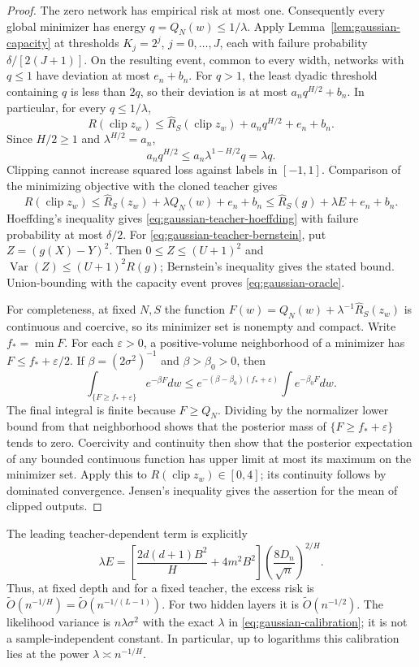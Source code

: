 \begin{proof}
The zero network has empirical risk at most one.  Consequently every
global minimizer has energy $q=Q_N(w)\leq1/\lambda$.
Apply Lemma~\ref{lem:gaussian-capacity} at thresholds
$K_j=2^j$, $j=0,\ldots,J$, each with failure probability
$\delta/[2(J+1)]$.  On the resulting event, common to every width,
networks with $q\leq1$ have deviation at most $e_n+b_n$.  For $q>1$,
the least dyadic threshold containing $q$ is less than $2q$, so their
deviation is at most $a_n q^{H/2}+b_n$.  In particular, for every
$q\leq1/\lambda$,
\[
 R(\operatorname{clip}z_w)
 \leq\widehat R_S(\operatorname{clip}z_w)
       +a_nq^{H/2}+e_n+b_n.
\]
Since $H/2\geq1$ and $\lambda^{H/2}=a_n$,
\[
 a_nq^{H/2}\leq a_n\lambda^{1-H/2}q=\lambda q.
\]
Clipping cannot increase squared loss against labels in $[-1,1]$.
Comparison of the minimizing objective with the cloned teacher gives
\[
 R(\operatorname{clip}z_w)
 \leq\widehat R_S(z_w)+\lambda Q_N(w)+e_n+b_n
 \leq\widehat R_S(g)+\lambda E+e_n+b_n.
\]
Hoeffding's inequality gives
\eqref{eq:gaussian-teacher-hoeffding} with failure probability at most
$\delta/2$.  For \eqref{eq:gaussian-teacher-bernstein}, put
$Z=(g(X)-Y)^2$.  Then $0\leq Z\leq(U+1)^2$ and
$\operatorname{Var}(Z)\leq(U+1)^2R(g)$; Bernstein's inequality gives
the stated bound.  Union-bounding with the capacity event proves
\eqref{eq:gaussian-oracle}.

For completeness, at fixed $N,S$ the function
$F(w)=Q_N(w)+\lambda^{-1}\widehat R_S(z_w)$ is continuous and coercive,
so its minimizer set is nonempty and compact.  Write $f_* =\min F$.
For each $\varepsilon>0$, a positive-volume neighborhood of a minimizer
has $F\leq f_*+\varepsilon/2$.  If $\beta=(2\sigma^2)^{-1}$ and
$\beta>\beta_0>0$, then
\[
 \int_{\{F\geq f_*+\varepsilon\}}e^{-\beta F}dw
 \leq e^{-(\beta-\beta_0)(f_*+\varepsilon)}
       \int e^{-\beta_0F}dw.
\]
The final integral is finite because $F\geq Q_N$.  Dividing by the
normalizer lower bound from that neighborhood shows that the posterior
mass of $\{F\geq f_*+\varepsilon\}$ tends to zero.  Coercivity and
continuity then show that the posterior expectation of any bounded
continuous function has upper limit at most its maximum on the
minimizer set.  Apply this to $R(\operatorname{clip}z_w)\in[0,4]$;
its continuity follows by dominated convergence.  Jensen's inequality
gives the assertion for the mean of clipped outputs.
\end{proof}

The leading teacher-dependent term is explicitly
\begin{equation}
 \lambda E=
 \left[\frac{2d(d+1)B^2}{H}+4m^2B^2\right]
 \left(\frac{8D_n}{\sqrt n}\right)^{2/H}.
 \label{eq:gaussian-leading-term}
\end{equation}
Thus, at fixed depth and for a fixed teacher, the excess risk is
$\widetilde O(n^{-1/H})=\widetilde O(n^{-1/(L-1)})$.
For two hidden layers it is $\widetilde O(n^{-1/2})$.
The likelihood variance is $n\lambda\sigma^2$ with the exact
$\lambda$ in \eqref{eq:gaussian-calibration}; it is not a sample-independent
constant.  In particular, up to logarithms this calibration lies at the
power $\lambda\asymp n^{-1/H}$.

